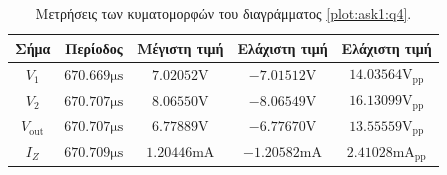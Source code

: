 \begin{table}[h]
	\begin{center}
		\begin{tabular}{|c|c|c|c|c|}
			\hline
			\textbf{Σήμα}      & \textbf{Περίοδος}             & \textbf{Μέγιστη τιμή}         & \textbf{Ελάχιστη τιμή}         & \textbf{Ελάχιστη τιμή}                       \\
			\hline
			\hline
			$V_1$              & $670.669\unit{\micro\second}$ & $7.02052\unit{\volt}$         & $-7.01512\unit{\volt}$         & $14.03564\unit{\volt}_{\mathrm{pp}}$         \\\hline
			$V_2$              & $670.707\unit{\micro\second}$ & $8.06550\unit{\volt}$         & $-8.06549\unit{\volt}$         & $16.13099\unit{\volt}_{\mathrm{pp}}$         \\\hline
			$V_{\mathrm{out}}$ & $670.707\unit{\micro\second}$ & $6.77889\unit{\volt}$         & $-6.77670\unit{\volt}$         & $13.55559\unit{\volt}_{\mathrm{pp}}$         \\\hline
			$I_Z$              & $670.709\unit{\micro\second}$ & $1.20446\unit{\milli\ampere}$ & $-1.20582\unit{\milli\ampere}$ & $2.41028\unit{\milli\ampere}_{\mathrm{pp}}$ \\\hline
		\end{tabular}
		\caption{Μετρήσεις των κυματομορφών του διαγράμματος \ref{plot:ask1:q4}.}
		\label{table:ask1:q4:periods}
	\end{center}
\end{table}